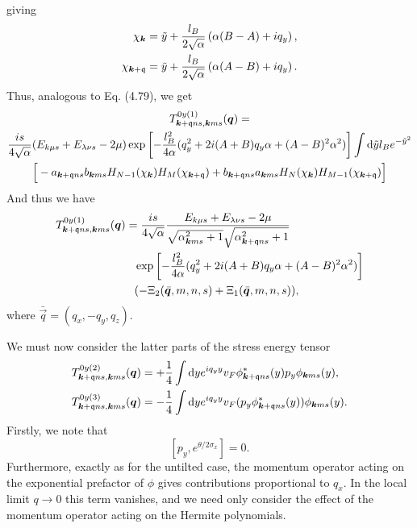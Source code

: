 giving
\begin{align}
  \chi _{\bm{k}} &= \tilde{y} + \frac{l_{B}}{2 \sqrt{\alpha }} \left(\alpha (B-A) + i q_{y}\right),\\
  \chi _{\bm{k} + \mathfrak{q}} &= \tilde{y} + \frac{l_{B}}{2 \sqrt{\alpha }} \left(\alpha (A-B) + i q_{y}\right).
\end{align}
Thus, analogous to Eq. (4.79), we get
\begin{multline}
  \label{eq:50}
  T_{\bm{k} + \mathfrak{q} n s, \bm{k} m s}^{0y (1)} (\bm{q}) =\\
  \frac{is}{4 \sqrt{\alpha} }
  (E_{k\mu s} + E_{\lambda  \nu  s} - 2 \mu)
  \exp \left[
    -\frac{l_{B}^2}{4 \alpha } (q_{y}^2 + 2i (A+B) q_{y} \alpha + (A-B)^2 \alpha^2)
  \right  ]
  \int \mathrm{d} \tilde{y} l_{B} e^{-\tilde{y}^2}\\
 \Big[
  - a_{\bm{k} + \mathfrak{q} ns} b_{\bm{k} m s}
  H_{N-1} ( \chi _{\bm{k}} )
  H_{M} ( \chi _{\bm{k} + \mathfrak{q}} )
  + b_{\bm{k} + \mathfrak{q} ns } a_{\bm{k} m s}
  H_{N}( \chi _{\bm{k}} )
  H_{M-1} ( \chi _{\bm{k} + \mathfrak{q}} )
  \Big]
\end{multline}
And thus we have
\begin{align}
  T_{\vec{k} + \qvec{q} n s, \vec{k} m s}^{0y (1)} (\vec{q}) &=
  \frac{is}{4 \sqrt{\alpha} }
  \frac{E_{k\mu s} + E_{\lambda  \nu  s} - 2 \mu}{
    \sqrt{\alpha _{\vec{k} m s}^2 + 1}
    \sqrt{\alpha _{\vec{k} + \qvec{q} n s}^2 + 1}
  }\\
  &\pe \exp \left[
    -\frac{l_{B}^2}{4 \alpha } (q_{y}^2 + 2i (A+B) q_{y} \alpha + (A-B)^2 \alpha^2)
  \right  ]\\
  &\pe (-\Xi_{2} (\bar{\vec{q}}, m, n, s) + \Xi_{1}(\bar{\vec{q}}, m, n, s)),
\end{align}
where \(\bar{\vec{q}} = (q_{x}, -q_{y}, q_{z})\).

We must now consider the latter parts of the stress energy tensor
\begin{align}
  T_{\bm{k} + \mathfrak{q} ns, \bm{k} ms}^{0y (2)} (\bm{q}) &=
                                                             + \frac{1}{4} \int \mathrm{d} y
                                                             e^{iq_{y} y} v_{F}
                                                             \phi ^{*}_{\bm{k}+\mathfrak{q} ns} (y) p_{y} \phi _{\bm{k} m s} (y),\\
  T_{\bm{k} + \mathfrak{q} ns, \bm{k} ms}^{0y (3)} (\bm{q}) &=
                                                             - \frac{1}{4} \int \mathrm{d} y
                                                             e^{iq_{y} y} v_{F}
                                                             (p_{y} \phi ^{*}_{\bm{k}+\mathfrak{q} ns} (y))  \phi _{\bm{k} m s} (y).
\end{align}
Firstly, we note that
\[
  [p_{y} , e^{\theta /2 \sigma _{x}}] = 0.
\]
Furthermore, exactly as for the untilted case, the momentum operator acting on the exponential prefactor of \(\phi \) gives contributions proportional to \(q_{x}\).
In the local limit \(q\to  0\) this term vanishes, and we need only consider the effect of the momentum operator acting on the Hermite polynomials.

